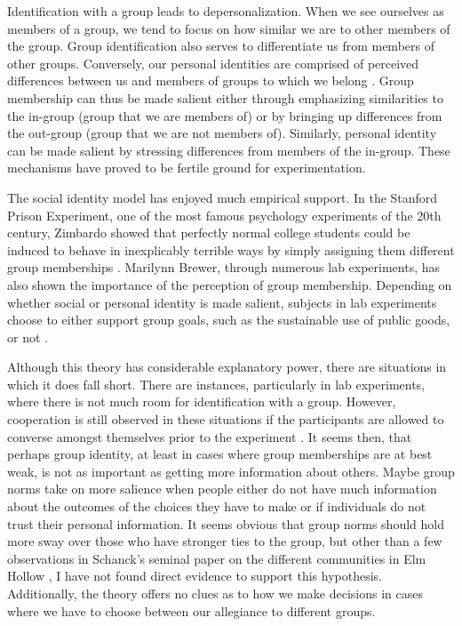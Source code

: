 \documentclass[rutwik_proposal.tex]{subfiles}
\begin{document}
Identification with a group leads to depersonalization. When we see ourselves as members of a group, we tend to focus on how similar we are to other members of the group. Group identification also serves to differentiate us from members of other groups. Conversely, our personal identities are comprised of perceived differences between us and members of groups to which we belong \cite{Brewer91}. Group membership can thus be made salient either through emphasizing similarities to the in-group (group that we are members of) or by bringing up differences from the out-group (group that we are not members of). Similarly, personal identity can be made salient by stressing differences from members of the in-group. These mechanisms have proved to be fertile ground for experimentation.

The social identity model has enjoyed much empirical support. In the Stanford Prison Experiment, one of the most famous psychology experiments of the 20th century, Zimbardo showed that perfectly normal college students could be induced to behave in inexplicably terrible ways by simply assigning them different group memberships \cite{Zimbardo07}. Marilynn Brewer, through numerous lab experiments, has also shown the importance of the perception of group membership. Depending on whether social or personal identity is made salient, subjects in lab experiments choose to either support group goals, such as the sustainable use of public goods, or not \cite{Brewer91, Kramer84, Brewer79}.

Although this theory has considerable explanatory power, there are situations in which it does fall short. There are instances, particularly in lab experiments, where there is not much room for identification with a group. However, cooperation is still observed in these situations if the participants are allowed to converse amongst themselves prior to the experiment \cite{Dawes00}. It seems then, that perhaps group identity, at least in cases where group memberships are at best weak, is not as important as getting more information about others. Maybe group norms take on more salience when people either do not have much information about the outcomes of the choices they have to make or if individuals do not trust their personal information. It seems obvious that group norms should hold more sway over those who have stronger ties to the group, but other than a few observations in Schanck's seminal paper on the different communities in Elm Hollow \cite{Schanck32}, I have not found direct evidence to support this hypothesis. Additionally, the theory offers no clues as to how we make decisions in cases where we have to choose between our allegiance to different groups.
\end{document}
